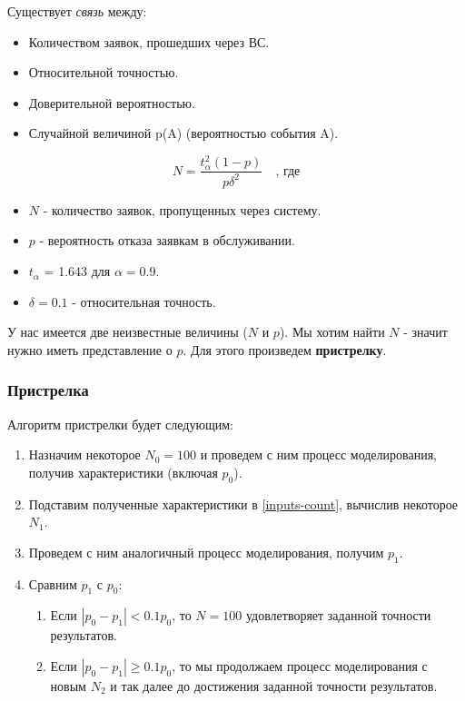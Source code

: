 \documentclass[a4paper, 14pt]{article}
\begin{document}
Существует \textit{связь} между:
\begin{itemize}
	\item Количеством заявок, прошедших через ВС.
	\item Относительной точностью.
	\item Доверительной вероятностью.
	\item Случайной величиной p(A) (вероятностью события A).
\end{itemize}
\begin{equation} \label{inputs-count}
	N = \frac{t_\alpha^2(1-p)}{p\delta^2} \quad \text{, где}
\end{equation}
\begin{itemize}
	\item $N$ - количество заявок, пропущенных через систему.
	\item $p$ - вероятность отказа заявкам в обслуживании.
	\item $t_\alpha$ = 1.643 для $\alpha = 0.9$.
	\item $\delta = 0.1$ - относительная точность.
\end{itemize}

У нас имеется две неизвестные величины ($N$ и $p$). Мы хотим найти $N$ - значит нужно иметь представление о $p$. Для этого произведем \textbf{пристрелку}.

\subsubsection{Пристрелка}

Алгоритм пристрелки будет следующим:

\begin{enumerate}
	\item Назначим некоторое $N_0 = 100$ и проведем с ним процесс моделирования, получив характеристики (включая $p_0$).
	\item Подставим полученные характеристики в \eqref{inputs-count}, вычислив некоторое $N_1$.
	\item Проведем с ним аналогичный процесс моделирования, получим $p_1$.
	\item Сравним $p_1$ с $p_0$:
	      \begin{enumerate}
		      \item Если $|p_0-p_1| < 0.1p_0$, то $N=100$ удовлетворяет заданной точности результатов.
		      \item Если $|p_0-p_1| \ge 0.1p_0$, то мы продолжаем процесс моделирования с новым $N_2$ и так далее до достижения заданной точности результатов.
	      \end{enumerate}
\end{enumerate}
\end{document}
